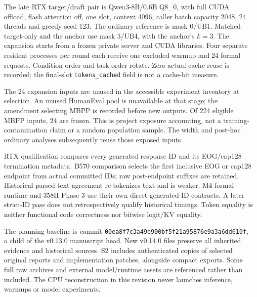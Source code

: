 The late RTX target/draft pair is Qwen3-8B/0.6B Q8\_0, with full CUDA offload, flash attention off, one slot, context 4096, caller batch capacity 2048, 24 threads and greedy seed 123. The ordinary reference is mask 0/UB1. Matched target-only and the anchor use mask 3/UB4, with the anchor's $k=3$. The expansion starts from a frozen private server and CUDA libraries. Four separate resident processes per round each receive one excluded warmup and 24 formal requests. Condition order and task order rotate. Zero actual cache reuse is recorded; the final-slot \texttt{tokens\_cached} field is not a cache-hit measure.

The 24 expansion inputs are unused in the accessible experiment inventory at selection. An unused HumanEval pool is unavailable at that stage; the amendment selecting MBPP is recorded before new outputs. Of 224 eligible MBPP inputs, 24 are frozen. This is project exposure accounting, not a training-contamination claim or a random population sample. The width and post-hoc ordinary analyses subsequently reuse those exposed inputs.

RTX qualification compares every generated response ID and its EOG/cap128 termination metadata. B570 comparison selects the first inclusive EOG or cap128 endpoint from actual committed IDs; raw post-endpoint suffixes are retained. Historical parsed-text agreement re-tokenizes text and is weaker. M4 formal runtime and 358H Phase 3 use their own direct generated-ID contracts. A later strict-ID pass does not retrospectively qualify historical timings. Token equality is neither functional code correctness nor bitwise logit/KV equality.

The planning baseline is commit \nolinkurl{00ea8f7c3a49b900bf5f21a95876e9a3a6dd610f}, a child of the v0.13.0 manuscript head. New v0.14.0 files preserve all inherited evidence and historical sources. S2 includes authenticated copies of selected original reports and implementation patches, alongside compact exports. Some full raw archives and external model/runtime assets are referenced rather than included. The CPU reconstruction in this revision never launches inference, warmups or model experiments.
